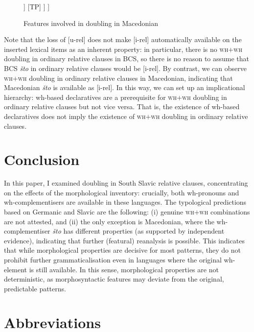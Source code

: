 \documentclass[output=paper]{langscibook}
\begin{document}
\begin{figure} 
\caption{Features involved in doubling in Macedonian}
\label{bacsk:fig:treekojstofeat}
\begin{forest}
[CP
	[koj\textsubscript{{[}u-rel{]}}]
	[C$'$
		[C\textsubscript{{[}i-rel{]},{[}fin{]}} [što\textsubscript{{[}i-rel{]},{[}fin{]}}]]
		[TP]
	]
]
\end{forest}
\end{figure}

Note that the loss of [u-rel] does not make [i-rel] automatically available on the inserted lexical items as an inherent property: in particular, there is no \textsc{wh}$+$\textsc{wh} doubling in ordinary relative clauses in BCS, so there is no reason to assume that BCS \textit{što} in ordinary relative clauses would be [i-rel]. By contrast, we can observe \textsc{wh}$+$\textsc{wh} doubling in ordinary relative clauses in Macedonian, indicating that Macedonian \textit{što} is available as [i-rel]. In this way, we can set up an implicational hierarchy: wh-based declaratives are a prerequisite for \textsc{wh}$+$\textsc{wh} doubling in ordinary relative clauses but not vice versa. That is, the existence of wh-based declaratives does not imply the existence of \textsc{wh}$+$\textsc{wh} doubling in ordinary relative clauses.

\section{Conclusion}
In this paper, I examined doubling in South Slavic relative clauses, concentrating on the effects of the morphological inventory: crucially, both wh-pronouns and wh-complementisers are available in these languages. The typological predictions based on Germanic and Slavic are the following: (i) genuine \textsc{wh}$+$\textsc{wh} combinations are not attested, and (ii) the only exception is Macedonian, where the wh-complementiser \textit{što} has different properties (as supported by independent evidence), indicating that further (featural) reanalysis is possible. This indicates that while morphological properties are decisive for most patterns, they do not prohibit further grammaticalisation even in languages where the original wh-element is still available. In this sense, morphological properties are not deterministic, as morphosyntactic features may deviate from the original, predictable patterns.


%

\section*{Abbreviations}
\end{document}
